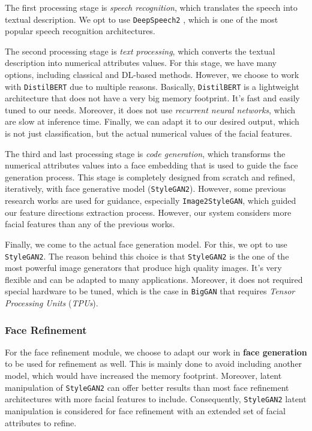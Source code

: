 The first processing stage is \emph{speech recognition}, which translates the speech into textual description. We opt to use \texttt{DeepSpeech2} \cite{amodei2015deep}, which is one of the most popular speech recognition architectures.

The second processing stage is \emph{text processing}, which converts the textual description into numerical attributes values. For this stage, we have many options, including classical and DL-based methods. However, we choose to work with \texttt{DistilBERT} \cite{sanh2020distilbert} due to multiple reasons. Basically, \texttt{DistilBERT} is a lightweight architecture that does not have a very big memory footprint. It's fast and easily tuned to our needs. Moreover, it does not use \emph{recurrent neural networks}, which are slow at inference time. Finally, we can adapt it to our desired output, which is not just classification, but the actual numerical values of the facial features.

The third and last processing stage is \emph{code generation}, which transforms the numerical attributes values into a face embedding that is used to guide the face generation process. This stage is completely designed from scratch and refined, iteratively, with face generative model (\texttt{StyleGAN2}). However, some previous research works are used for guidance, especially \texttt{Image2StyleGAN}, which guided our feature directions extraction process. However, our system considers more facial features than any of the previous works.

Finally, we come to the actual face generation model. For this, we opt to use \texttt{StyleGAN2}. The reason behind this choice is that \texttt{StyleGAN2} is the one of the most powerful image generators that produce high quality images. It's very flexible and can be adapted to many applications. Moreover, it does not required special hardware to be tuned, which is the case in \texttt{BigGAN} that requires \emph{Tensor Processing Units} (\emph{TPUs}).

\subsubsection{Face Refinement}
For the face refinement module, we choose to adapt our work in \textbf{face generation} to be used for refinement as well. This is mainly done to avoid including another model, which would have increased the memory footprint. Moreover, latent manipulation of \texttt{StyleGAN2} can offer better results than most face refinement architectures with more facial features to include. Consequently, \texttt{StyleGAN2} latent manipulation is considered for face refinement with an extended set of facial attributes to refine.

